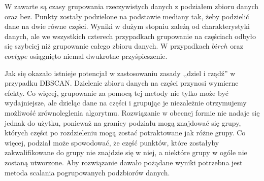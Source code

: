 
W  zawarte są czasy grupowania rzeczywistych danych z podziałem zbioru danych oraz bez. Punkty zostały podzielone na podstawie mediany tak, żeby podzielić dane na dwie równe części. Wyniki w dużym stopniu zależą od charakterystyki danych, ale we wszystkich czterech przypadkach grupowanie na częściach odbyło się szybciej niż grupowanie całego zbioru danych. W przypadkach $ birch $ oraz $ covtype $ osiągnięto niemal dwukrotne przyśpieszenie.\par
Jak się okazało istnieje potencjał w zastosowaniu zasady ,,dziel i rządź'' w przypadku DBSCAN. Dzielenie zbioru danych na części przynosi wymierne efekty. Co więcej, grupowanie za pomocą tej metody nie tylko może być wydajniejsze, ale dzieląc dane na części i grupując je niezależnie otrzymujemy możliwość zrównoleglenia algorytmu. Rozwiązanie w obecnej formie nie nadaje się jednak do użytku, ponieważ na granicy podziału mogą znajdować się grupy, których części po rozdzieleniu mogą zostać potraktowane jak różne grupy. Co więcej, podział może spowodować, że  część punktów, które zostałyby zakwalifikowane do grupy nie znajdzie się w niej, a niektóre grupy w ogóle nie zostaną utworzone. Aby rozwiązanie dawało pożądane wyniki potrzebna jest metoda scalania pogrupowanych podzbiorów danych.

